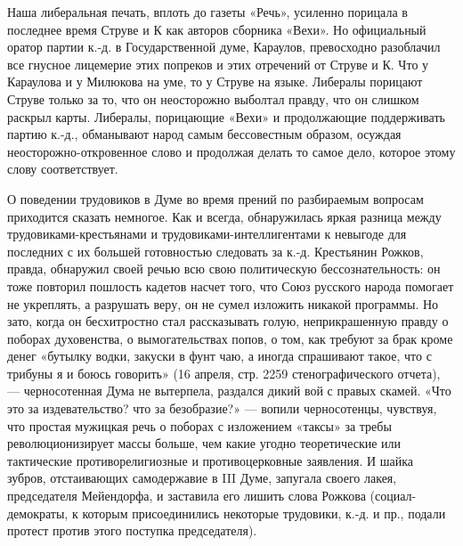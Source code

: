 \documentclass[12pt]{article}
\newcommand{\parnum}{(\arabic{parcount})}
\newcounter{parcount}
\newenvironment{parnumbers}{%
  \par%
  \everypar{\noindent \stepcounter{parcount}\marginpar[]{\parnum}}%
}{}
\begin{document}
\begin{parnumbers}
Наша либеральная печать, вплоть до газеты «Речь», усиленно порицала в последнее время Струве и К как авторов сборника «Вехи». Но официальный оратор партии к.-д. в Государственной думе, Караулов, превосходно разоблачил все гнусное лицемерие этих попреков и этих отречений от Струве и К. Что у Караулова и у Милюкова на уме, то у Струве на языке. Либералы порицают Струве только за то, что он неосторожно выболтал правду, что он слишком раскрыл карты. Либералы, порицающие «Вехи» и продолжающие поддерживать партию к.-д., обманывают народ самым бессовестным образом, осуждая неосторожно-откровенное слово и продолжая делать то самое дело, которое этому слову соответствует.

О поведении трудовиков в Думе во время прений по разбираемым вопросам приходится сказать немногое. Как и всегда, обнаружилась яркая разница между трудовиками-крестьянами и трудовиками-интеллигентами к невыгоде для последних с их большей готовностью следовать за к.-д. Крестьянин Рожков, правда, обнаружил своей речью всю свою политическую бессознательность: он тоже повторил пошлость кадетов насчет того, что Союз русского народа помогает не укреплять, а разрушать веру, он не сумел изложить никакой программы. Но зато, когда он бесхитростно стал рассказывать голую, неприкрашенную правду о поборах духовенства, о вымогательствах попов, о том, как требуют за брак кроме денег «бутылку водки, закуски в фунт чаю, а иногда спрашивают такое, что с трибуны я и боюсь говорить» (16 апреля, стр. 2259 стенографического отчета), — черносотенная Дума не вытерпела, раздался дикий вой с правых скамей. «Что это за издевательство? что за безобразие?» — вопили черносотенцы, чувствуя, что простая мужицкая речь о поборах с изложением «таксы» за требы революционизирует массы больше, чем какие угодно теоретические или тактические противорелигиозные и противоцерковные заявления. И шайка зубров, отстаивающих самодержавие в III Думе, запугала своего лакея, председателя Мейендорфа, и заставила его лишить слова Рожкова (социал-демократы, к которым присоединились некоторые трудовики, к.-д. и пр., подали протест против этого поступка председателя).


\end{parnumbers}
\end{document}
